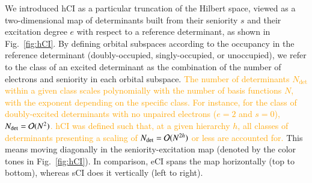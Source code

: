 \documentclass[aip,jcp,reprint,noshowkeys,superscriptaddress]{revtex4-1}
\newcommand{\fk}[1]{\textcolor{orange}{#1}}
\newcommand{\Ndet}{N_\text{det}}
\begin{document}
We introduced hCI \cite{Kossoski_2022} as a particular truncation of the Hilbert space,
viewed as a two-dimensional map of determinants built from their seniority $s$ and their excitation degree $e$ with respect to a reference determinant, as shown in Fig.~\ref{fig:hCI}.
By defining orbital subspaces according to the occupancy in the reference determinant (doubly-occupied, singly-occupied, or unoccupied),
we refer to the class of an excited determinant as the combination of the number of electrons and seniority in each orbital subspace.
\fk{The number of determinants $\Ndet$ within a given class scales polynomially with the number of basis functions $N$, with the exponent depending on the specific class.
For instance, for the class of doubly-excited determinants with no unpaired electrons ($e=2$ and $s=0$), $\Ndet = \order*{N^2}$.
hCI was defined such that, at a given hierarchy $h$, all classes of determinants presenting a scaling of $\Ndet = \order*{N^{2h}}$ or less are accounted for.}
This means moving diagonally in the seniority-excitation map (denoted by the color tones in Fig.~\ref{fig:hCI}).
In comparison, eCI spans the map horizontally (top to bottom), whereas sCI does it vertically (left to right).
\end{document}

